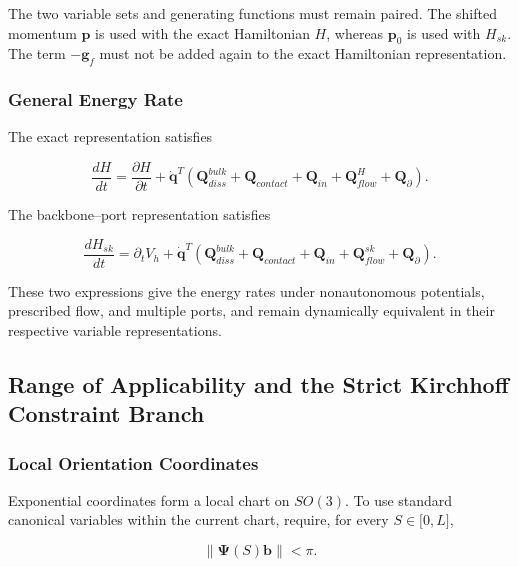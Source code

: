 The two variable sets and generating functions must remain paired. The shifted momentum \(\mathbf{p}\) is used with the exact Hamiltonian \(H\), whereas \(\mathbf{p}_{0}\) is used with \(H_{sk}\). The term \(-\mathbf{g}_{f}\) must not be added again to the exact Hamiltonian representation.

\subsubsection{General Energy Rate}\label{sec:hamiltonian-3-5-5}

The exact representation satisfies

\begin{equation}
\label{eq:hamiltonian-3-59}
\boxed{\frac{dH}{dt} = \frac{\partial H}{\partial t} + {\dot{\mathbf{q}}}^{T}\left( \mathbf{Q}_{diss}^{bulk} + \mathbf{Q}_{contact} + \mathbf{Q}_{in} + \mathbf{Q}_{flow}^{H} + \mathbf{Q}_{\partial} \right).}
\end{equation}

The backbone--port representation satisfies

\begin{equation}
\label{eq:hamiltonian-3-60}
\boxed{\frac{dH_{sk}}{dt} = \partial_{t}V_{h} + {\dot{\mathbf{q}}}^{T}\left( \mathbf{Q}_{diss}^{bulk} + \mathbf{Q}_{contact} + \mathbf{Q}_{in} + \mathbf{Q}_{flow}^{sk} + \mathbf{Q}_{\partial} \right).}
\end{equation}

These two expressions give the energy rates under nonautonomous potentials, prescribed flow, and multiple ports, and remain dynamically equivalent in their respective variable representations.

\subsection{Range of Applicability and the Strict Kirchhoff Constraint Branch}\label{sec:hamiltonian-3-6}

\subsubsection{Local Orientation Coordinates}\label{sec:hamiltonian-3-6-1}

Exponential coordinates form a local chart on \(SO(3)\). To use standard canonical variables within the current chart, require, for every \(S\in\lbrack 0,L\rbrack\),

\begin{equation}
\label{eq:hamiltonian-3-61}
\parallel \bm{\Psi}(S)\mathbf{b} \parallel < \pi.
\end{equation}


